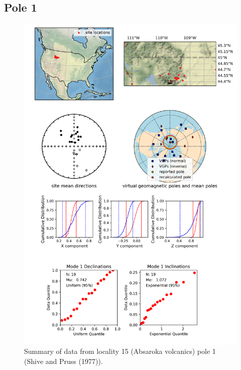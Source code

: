 \subsection{Pole 1}


\begin{figure}[H]
\centering
\includegraphics[width=5 in]{./15/1/pole_summary.png}
\caption{Summary of data from locality 15 (Absaroka volcanics) pole 1 (Shive and Pruss (1977)).}
\end{figure}

